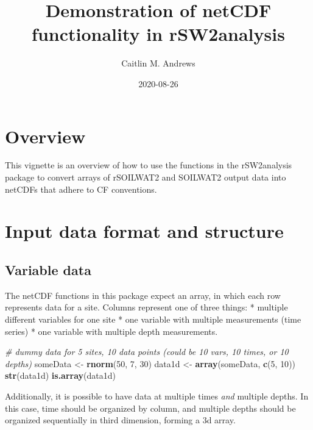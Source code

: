 \documentclass[
]{article}
\title{Demonstration of netCDF functionality in rSW2analysis}
\author{Caitlin M. Andrews}
\date{2020-08-26}
\newenvironment{Shaded}{\begin{snugshade}}{\end{snugshade}}
\newcommand{\CommentTok}[1]{\textcolor[rgb]{0.56,0.35,0.01}{\textit{#1}}}
\newcommand{\DecValTok}[1]{\textcolor[rgb]{0.00,0.00,0.81}{#1}}
\newcommand{\KeywordTok}[1]{\textcolor[rgb]{0.13,0.29,0.53}{\textbf{#1}}}
\newcommand{\NormalTok}[1]{#1}
\newcommand{\StringTok}[1]{\textcolor[rgb]{0.31,0.60,0.02}{#1}}
\begin{document}
\maketitle

{
\setcounter{tocdepth}{2}
\tableofcontents
}
\hypertarget{overview}{%
\section{Overview}\label{overview}}

This vignette is an overview of how to use the functions in the rSW2analysis package to
convert arrays of rSOILWAT2 and SOILWAT2 output data into netCDFs that adhere to CF conventions.

\hypertarget{input-data-format-and-structure}{%
\section{Input data format and structure}\label{input-data-format-and-structure}}

\hypertarget{variable-data}{%
\subsection{Variable data}\label{variable-data}}

The netCDF functions in this package expect an array, in which each row represents
data for a site. Columns represent one of three things:
* multiple different variables for one site
* one variable with multiple measurements (time series)
* one variable with multiple depth measurements.

\begin{Shaded}
\begin{Highlighting}[]
   \CommentTok{\# dummy data for 5 sites, 10 data points (could be 10 vars, 10 times, or 10 depths)}
\NormalTok{   someData \textless{}{-}}\StringTok{ }\KeywordTok{rnorm}\NormalTok{(}\DecValTok{50}\NormalTok{, }\DecValTok{7}\NormalTok{, }\DecValTok{30}\NormalTok{)}
\NormalTok{   data1d \textless{}{-}}\StringTok{ }\KeywordTok{array}\NormalTok{(someData, }\KeywordTok{c}\NormalTok{(}\DecValTok{5}\NormalTok{, }\DecValTok{10}\NormalTok{))}
   \KeywordTok{str}\NormalTok{(data1d)}
   \KeywordTok{is.array}\NormalTok{(data1d)}
\end{Highlighting}
\end{Shaded}

Additionally, it is possible to have data at multiple times \emph{and} multiple depths.
In this case, time should be organized by column, and multiple depths should be organized
sequentially in third dimension, forming a 3d array.
\end{document}
